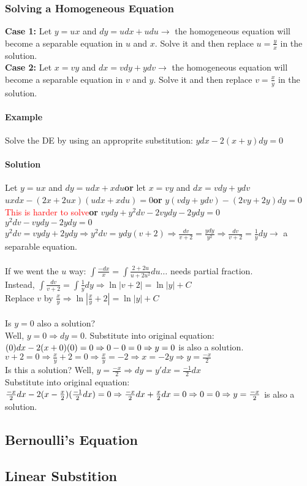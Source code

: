 \documentclass{article}
\begin{document}
\subsubsection{Solving a Homogeneous Equation}
\textbf{Case 1:} Let $y=ux$ and $dy=udx+udu\to$ the homogeneous equation will become a separable equation in $u$ and $x$.
Solve it and then replace $u=\frac{y}{x}$ in the solution.
\\\textbf{Case 2:} Let $x=vy$ and $dx=vdy+ydv\to$ the homogeneous equation will become a separable equation in $v$ and $y$.
Solve it and then replace $v=\frac{x}{y}$ in the solution.

\newpage\paragraph{Example} Solve the DE by using an approprite substitution: $ydx-2(x+y)dy=0$
\paragraph{Solution} Let $y=ux$ and $dy=udx+xdu$\qquad\textbf{or} let $x=vy$ and $dx=vdy+ydv$
\\$uxdx-(2x+2ux)(udx+xdu)=0$\qquad\qquad\qquad\textbf{or} $y(vdy+ydv)-(2vy+2y)dy=0$
\\\textcolor{red}{This is harder to solve}\qquad\qquad\qquad\qquad\qquad\qquad\textbf{or} $vydy+y^2dv-2vydy-2ydy=0$
\\$y^2dv-vydy-2ydy=0$
\\$y^2dv=vydy+2ydy\Rightarrow y^2dv=ydy(v+2)\Rightarrow\frac{dv}{v+2}=\frac{ydy}{y^2}\Rightarrow\frac{dv}{v+2}=\frac{1}{y}dy\to$ a separable equation.
\\\\If we went the $u$ way: $\int\frac{-dx}{x}=\int\frac{2+2u}{u+2u^2}du\dots$ needs partial fraction.
\\Instead, $\int\frac{dv}{v+2}=\int\frac{1}{y}dy\Rightarrow \ln|v+2|=\ln|y|+C$
\\Replace $v$ by $\frac{x}{y}\Rightarrow\ln|\frac{x}{y}+2|=\ln|y|+C$
\\\\Is $y=0$ also a solution?
\\Well, $y=0\Rightarrow dy=0$. Substitute into original equation: $(0)dx-2(x+0)(0)=0\Rightarrow0-0=0\\\Rightarrow y=0$ is also a solution.
\\$v+2=0\Rightarrow\frac{x}{y}+2=0\Rightarrow\frac{x}{y}=-2\Rightarrow x=-2y\Rightarrow y=\frac{-x}{2}$
\\Is this a solution? Well, $y=\frac{-x}{2}\Rightarrow dy=y'dx=\frac{-1}{2}dx$
\\Substitute into original equation: $\frac{-x}{2}dx-2(x-\frac{x}{2})(\frac{-1}{2}dx)=0\Rightarrow
\frac{-x}{2}dx+\frac{x}{2}dx=0\Rightarrow0=0\\\Rightarrow y=\frac{-x}{2}$ is also a solution.


\subsection{Bernoulli's Equation}
\subsection{Linear Substition}
\end{document}

